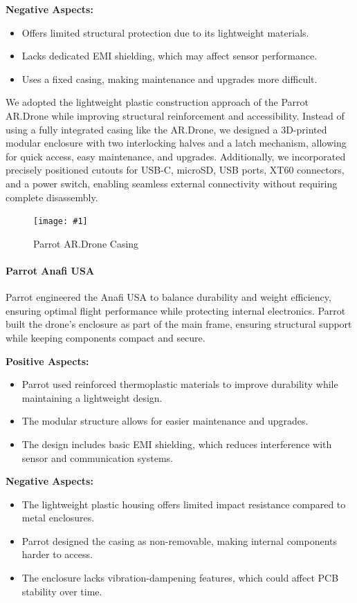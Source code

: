 \documentclass[12pt]{article}
\newcommand{\quickfigure}[4]{%
\begin{figure}[!htbp]
\centering
\texttt{[image: \#1]}
\caption{#3}
\label{#4}
\end{figure}%
}
\begin{document}
\textbf{Negative Aspects:}
\begin{itemize}
    \item Offers limited structural protection due to its lightweight materials.
    \item Lacks dedicated EMI shielding, which may affect sensor performance.
    \item Uses a fixed casing, making maintenance and upgrades more difficult.
\end{itemize}

\par We adopted the lightweight plastic construction approach of the Parrot AR.Drone while improving structural reinforcement and accessibility. Instead of using a fully integrated casing like the AR.Drone, we designed a 3D-printed modular enclosure with two interlocking halves and a latch mechanism, allowing for quick access, easy maintenance, and upgrades. Additionally, we incorporated precisely positioned cutouts for USB-C, microSD, USB ports, XT60 connectors, and a power switch, enabling seamless external connectivity without requiring complete disassembly.
\newpage
\quickfigure{images/parrot-AR-drone-casing.jpg}{7.5cm}{Parrot AR.Drone Casing}{parrot-ardrone-casing}

\paragraph{Parrot Anafi USA}

\par Parrot engineered the Anafi USA to balance durability and weight efficiency, ensuring optimal flight performance while protecting internal electronics. Parrot built the drone’s enclosure as part of the main frame, ensuring structural support while keeping components compact and secure.

\textbf{Positive Aspects:}
\begin{itemize}
    \item Parrot used reinforced thermoplastic materials to improve durability while maintaining a lightweight design.
    \item The modular structure allows for easier maintenance and upgrades.
    \item The design includes basic EMI shielding, which reduces interference with sensor and communication systems.
\end{itemize}

\textbf{Negative Aspects:}
\begin{itemize}
    \item The lightweight plastic housing offers limited impact resistance compared to metal enclosures.
    \item Parrot designed the casing as non-removable, making internal components harder to access.
    \item The enclosure lacks vibration-dampening features, which could affect PCB stability over time.
\end{itemize}
\end{document}
